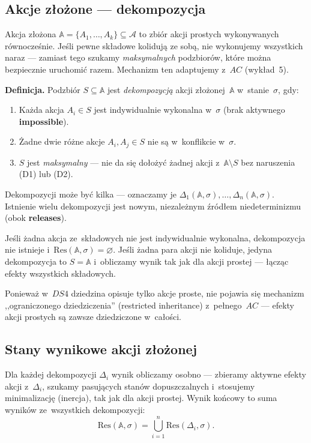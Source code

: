 \documentclass[11pt,a4paper]{article}
\newcommand{\impossible}{\textbf{impossible}}
\newcommand{\releases}{\textbf{releases}}
\begin{document}
\subsection*{Akcje złożone --- dekompozycja}

Akcja złożona $\mathbb{A} = \{A_1, \ldots, A_k\} \subseteq \mathcal{A}$
to zbiór akcji prostych wykonywanych równocześnie.
Jeśli pewne składowe kolidują ze sobą, nie wykonujemy wszystkich naraz ---
zamiast tego szukamy \emph{maksymalnych} podzbiorów,
które można bezpiecznie uruchomić razem.
Mechanizm ten adaptujemy z~$AC$ (wykład~5).

\medskip
\noindent\textbf{Definicja.}
Podzbiór $S \subseteq \mathbb{A}$ jest \emph{dekompozycją}
akcji złożonej~$\mathbb{A}$ w~stanie~$\sigma$, gdy:
\begin{enumerate}
  \item[\textbf{(D1)}] Każda akcja $A_i \in S$ jest indywidualnie wykonalna
        w~$\sigma$ (brak aktywnego \impossible{}).
  \item[\textbf{(D2)}] Żadne dwie różne akcje $A_i, A_j \in S$ nie są
        w~konflikcie w~$\sigma$.
  \item[\textbf{(D3)}] $S$ jest \emph{maksymalny} --- nie da się dołożyć żadnej
        akcji z~$\mathbb{A} \setminus S$ bez naruszenia (D1) lub (D2).
\end{enumerate}

Dekompozycji może być kilka --- oznaczamy je
$\Delta_1(\mathbb{A}, \sigma), \ldots, \Delta_n(\mathbb{A}, \sigma)$.
Istnienie wielu dekompozycji jest nowym, niezależnym źródłem
niedeterminizmu (obok \releases{}).

\medskip
Jeśli żadna akcja ze~składowych nie jest indywidualnie wykonalna,
dekompozycja nie istnieje i~$\mathrm{Res}(\mathbb{A}, \sigma) = \varnothing$.
Jeśli żadna para akcji nie koliduje, jedyna dekompozycja to
$S = \mathbb{A}$ i~obliczamy wynik tak jak dla akcji prostej
--- łącząc efekty wszystkich składowych.

\medskip
Ponieważ w~$\mathit{DS4}$ dziedzina opisuje tylko akcje proste,
nie pojawia się mechanizm ,,ograniczonego dziedziczenia'' (restricted inheritance)
z~pełnego~$AC$ --- efekty akcji prostych są zawsze dziedziczone w~całości.

\subsection*{Stany wynikowe akcji złożonej}

Dla każdej dekompozycji $\Delta_i$ wynik obliczamy osobno ---
zbieramy aktywne efekty akcji z~$\Delta_i$, szukamy pasujących stanów
dopuszczalnych i~stosujemy minimalizację (inercja), tak jak dla akcji prostej.
Wynik końcowy to suma wyników ze~wszystkich dekompozycji:
\[
  \mathrm{Res}(\mathbb{A}, \sigma)
    = \bigcup_{i=1}^{n} \mathrm{Res}(\Delta_i, \sigma).
\]
\end{document}
